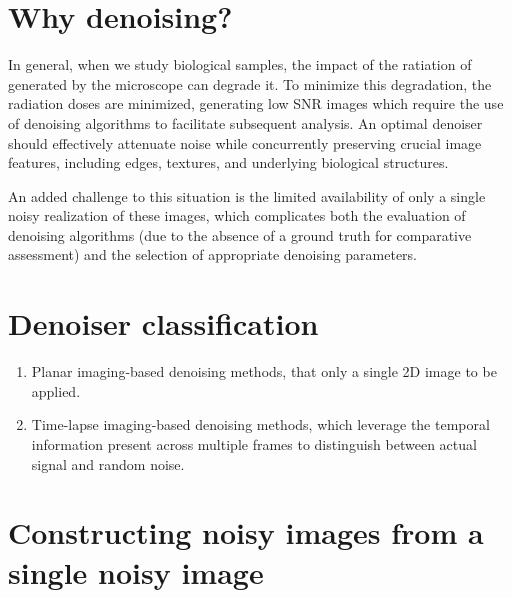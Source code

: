 
\section{Why denoising?}
\label{sec:why_denoising}


In general, when we study biological samples, the impact of the
ratiation of generated by the microscope can degrade it. To minimize
this degradation, the radiation doses are minimized, generating low
\gls{SNR} images which require the use of denoising algorithms to
facilitate subsequent analysis. An optimal denoiser should
effectively attenuate noise while concurrently preserving crucial
image features, including edges, textures, and underlying biological
structures.

An added challenge to this situation is the limited availability of
only a single noisy realization of these images, which complicates
both the evaluation of denoising algorithms (due to the absence of a
ground truth for comparative assessment) and the selection of
appropriate denoising parameters. 


\section{Denoiser classification}

\begin{enumerate}
  
\item Planar imaging-based denoising methods, that only a single 2D image to be applied.



\item Time-lapse imaging-based denoising methods, which leverage the
  temporal information present across multiple frames to distinguish
  between actual signal and random noise.
  


\end{enumerate}

\section{Constructing noisy images from a single noisy image}

